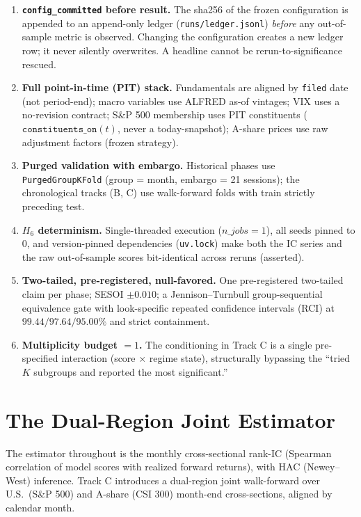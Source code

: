 \documentclass[11pt,a4paper]{article}
\begin{document}
\begin{enumerate}
\item \textbf{\texttt{config\_committed} before result.} The sha256 of the frozen
configuration is appended to an append-only ledger (\texttt{runs/ledger.jsonl})
\emph{before} any out-of-sample metric is observed. Changing the configuration creates
a new ledger row; it never silently overwrites. A headline cannot be
rerun-to-significance rescued.
\item \textbf{Full point-in-time (PIT) stack.} Fundamentals are aligned by
\texttt{filed} date (not period-end); macro variables use ALFRED as-of vintages;
VIX uses a no-revision contract; S\&P 500 membership uses PIT constituents
($\texttt{constituents\_on}(t)$, never a today-snapshot); A-share prices use raw
adjustment factors (frozen strategy).
\item \textbf{Purged validation with embargo.} Historical phases use
\texttt{PurgedGroupKFold} (group = month, embargo = 21 sessions); the chronological
tracks (B, C) use walk-forward folds with train strictly preceding test.
\item \textbf{$H_6$ determinism.} Single-threaded execution ($n\_jobs=1$), all seeds
pinned to $0$, and version-pinned dependencies (\texttt{uv.lock}) make both the IC
series and the raw out-of-sample scores bit-identical across reruns (asserted).
\item \textbf{Two-tailed, pre-registered, null-favored.} One pre-registered
two-tailed claim per phase; SESOI $\pm 0.010$; a Jennison--Turnbull group-sequential
equivalence gate \citep{jennison2000group} with look-specific repeated confidence
intervals (RCI) at $99.44/97.64/95.00\%$ and strict containment.
\item \textbf{Multiplicity budget $= 1$.} The conditioning in Track C is a single
pre-specified interaction (score $\times$ regime state), structurally bypassing the
``tried $K$ subgroups and reported the most significant.''
\end{enumerate}

\section{The Dual-Region Joint Estimator}\label{sec:estimator}

The estimator throughout is the monthly cross-sectional rank-IC (Spearman correlation
of model scores with realized forward returns), with HAC (Newey--West) inference.
Track C introduces a dual-region joint walk-forward over U.S.\ (S\&P 500) and A-share
(CSI 300) month-end cross-sections, aligned by calendar month.
\end{document}

